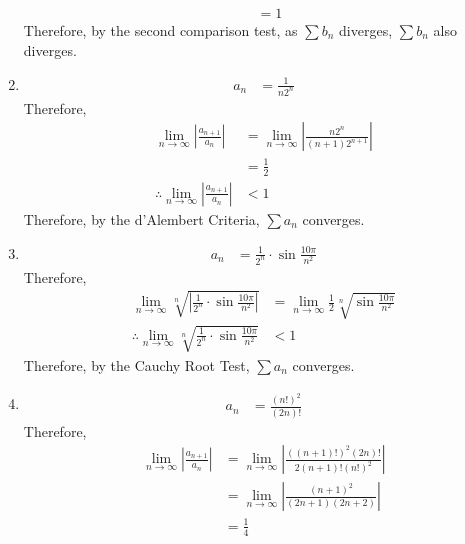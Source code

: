 \documentclass[fleqn, a4paper, 12pt, oneside]{amsart}
\theoremstyle{definition}
\theoremstyle{theorem}
\begin{document}
\begin{solution}
\begin{enumerate}[label=(\alph*), leftmargin=*]
\begin{align*}
                                                                           & = 1
			\end{align*}
			Therefore, by the second comparison test, as $\sum b_n$ diverges, $\sum b_n$ also diverges.
		\item
			\begin{align*}
				a_n & = \frac{1}{n 2^n}
			\end{align*}
			Therefore,
			\begin{align*}
				\lim\limits_{n \to \infty} \left| \frac{a_{n + 1}}{a_n} \right|            & = \lim\limits_{n \to \infty} \left| \frac{n 2^n}{(n + 1) 2^{n + 1}} \right| \\
                                                                                                           & = \frac{1}{2}                                                               \\
				\therefore \lim\limits_{n \to \infty} \left| \frac{a_{n + 1}}{a_n} \right| & < 1
			\end{align*}
			Therefore, by the d'Alembert Criteria, $\sum a_n$ converges.
		\item
			\begin{align*}
				a_n & = \frac{1}{2^n} \cdot \sin \frac{10 \pi}{n^2}
			\end{align*}
			Therefore,
			\begin{align*}
				\lim\limits_{n \to \infty} \sqrt[n]{\left| \frac{1}{2^n} \cdot \sin \frac{10 \pi}{n^2} \right|} & = \lim\limits_{n \to \infty} \frac{1}{2} \sqrt[n]{\sin \frac{10 \pi}{n^2}} \\
				\therefore \lim\limits_{n \to \infty} \sqrt[n]{\frac{1}{2^n} \cdot \sin \frac{10 \pi}{n^2}}     & < 1
			\end{align*}
			Therefore, by the Cauchy Root Test, $\sum a_n$ converges.
		\item
			\begin{align*}
				a_n & = \frac{(n!)^2}{(2n)!}
			\end{align*}
			Therefore,
			\begin{align*}
				\lim\limits_{n \to \infty} \left| \frac{a_{n + 1}}{a_n} \right| & = \lim\limits_{n \to \infty} \left| \frac{\left( (n + 1)! \right)^2 (2n)!}{2(n + 1)! (n!)^2} \right| \\
                                                                                                & = \lim\limits_{n \to \infty} \left| \frac{(n + 1)^2}{(2 n + 1) (2 n + 2)} \right|                    \\
                                                                                                & = \frac{1}{4}

\end{align*}
\end{enumerate}
\end{solution}
\end{document}
